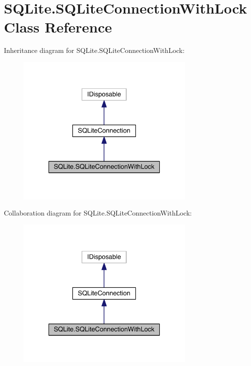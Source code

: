 \hypertarget{class_s_q_lite_1_1_s_q_lite_connection_with_lock}{\section{S\+Q\+Lite.\+S\+Q\+Lite\+Connection\+With\+Lock Class Reference}
\label{class_s_q_lite_1_1_s_q_lite_connection_with_lock}
}


Inheritance diagram for S\+Q\+Lite.\+S\+Q\+Lite\+Connection\+With\+Lock\+:
\nopagebreak
\begin{figure}[H]
\begin{center}
\leavevmode
\includegraphics[width=250pt]{class_s_q_lite_1_1_s_q_lite_connection_with_lock__inherit__graph}
\end{center}
\end{figure}


Collaboration diagram for S\+Q\+Lite.\+S\+Q\+Lite\+Connection\+With\+Lock\+:
\nopagebreak
\begin{figure}[H]
\begin{center}
\leavevmode
\includegraphics[width=250pt]{class_s_q_lite_1_1_s_q_lite_connection_with_lock__coll__graph}
\end{center}
\end{figure}
